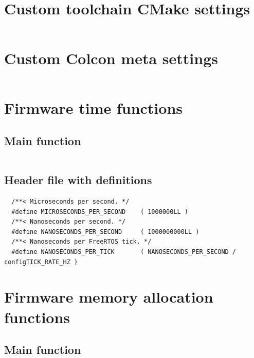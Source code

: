 \documentclass[10pt]{article}
\begin{document}
\pagebreak
\section{Custom toolchain CMake settings}
\label{sec:toolchainsettings}
\inputminted[linenos]{cmake}{./src/custom_r5f_toolchain.cmake}

\pagebreak
\section{Custom Colcon meta settings}
\label{sec:colconsettings}
\inputminted[linenos]{yaml}{./src/custom_r5f_colcon.meta}

\pagebreak
\section{Firmware time functions}
\label{sec:timefunctions}

\subsection{Main function}
\inputminted[linenos]{c}{./src/clock.c}

\subsection{Header file with definitions}
\begin{verbatim}
  /**< Microseconds per second. */
  #define MICROSECONDS_PER_SECOND    ( 1000000LL )  
  /**< Nanoseconds per second. */
  #define NANOSECONDS_PER_SECOND     ( 1000000000LL ) 
  /**< Nanoseconds per FreeRTOS tick. */  
  #define NANOSECONDS_PER_TICK       ( NANOSECONDS_PER_SECOND / configTICK_RATE_HZ ) 
\end{verbatim}


\pagebreak
\section{Firmware memory allocation functions}
\label{sec:allocfunctions}

\subsection{Main function}
\inputminted[linenos]{c}{./src/allocators.c}
\end{document}
